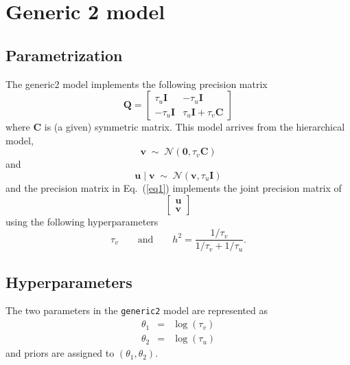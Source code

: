 \documentclass[a4paper,11pt]{article}
\def\mm#1{\ensuremath{\boldsymbol{#1}}} %
\begin{document}
\section*{Generic 2 model}

\subsection*{Parametrization}

The generic2 model implements the following precision matrix
\begin{equation}\label{eq1}%
    \mathbf{Q}=
    \begin{bmatrix}
        \tau_{u} \mm{I} & -\tau_{u}\mm{I} \\
        -\tau_{u}\mm{I} & \tau_{u}\mm{I} + \tau_{v} \mm{C}
    \end{bmatrix}
\end{equation}
where $\mathbf{C}$ is (a given) symmetric matrix. This model arrives
from the hierarchical model,
\begin{displaymath}
    \mm{v} \;\sim\; {\mathcal N}(\mm{0}, \tau_v \mm{C})
\end{displaymath}
and
\begin{displaymath}
    \mm{u}\mid \mm{v} \;\sim\; {\mathcal N}(\mm{v}, \tau_{u} \mm{I})
\end{displaymath}
and the precision matrix in Eq.~(\ref{eq1}) implements the joint
precision matrix of
\begin{displaymath}
    \begin{bmatrix}
        \mm{u}\\
        \mm{v}
    \end{bmatrix}
\end{displaymath}
using the following hyperparameters
\begin{displaymath}
    \tau_{v}\qquad\text{and}\qquad   h^{2} = \frac{1/\tau_{v}}{1/\tau_{v} + 1/\tau_{u}}.
\end{displaymath}


\subsection*{Hyperparameters}

The two parameters in the \texttt{generic2} model are represented as
\begin{eqnarray*}
    \theta_1 &= & \log(\tau_{v})\\
    \theta_2 &=& \log(\tau_{u}) 
\end{eqnarray*}
and priors are assigned to $(\theta_1,\theta_2)$.
\end{document}
